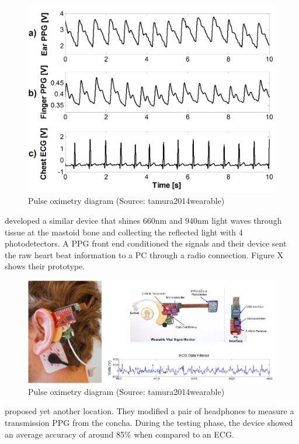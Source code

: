 \medskip

\begin{figure}[h]
   \centering
   \includegraphics[scale=0.15]{figs/DaHe}
   \caption{Pulse oximetry diagram (Source: tamura2014wearable)}
   \label{fig:DaHe}
\end{figure}

\cite{winokur2012wearable} developed a similar device that shines 660nm and 940nm light waves through tissue at the mastoid bone and collecting the reflected light with 4 photodetectors. A PPG front end conditioned the signals and their device sent the raw heart beat information to a PC through a radio connection. Figure X shows their prototype.

\medskip

\begin{figure}[h]
   \centering
   \includegraphics[scale=1]{figs/winokur}
   \caption{Pulse oximetry diagram (Source: tamura2014wearable)}
   \label{fig:winokur}
\end{figure}

\cite{buskeheartbeat} proposed yet another location. They modified a pair of headphones to measure a transmission PPG from the concha. During the testing phase, the device showed an average accuracy of around 85\% when compared to an ECG.

